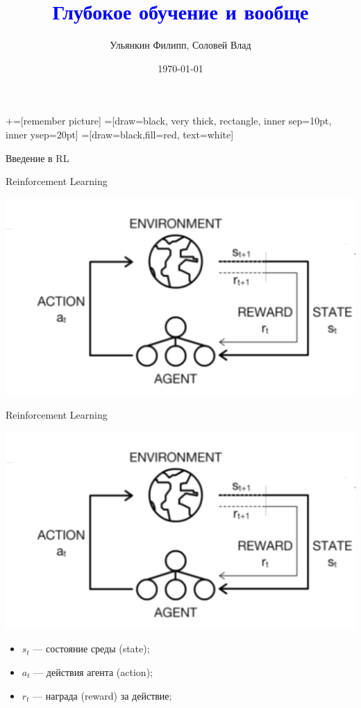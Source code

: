 \documentclass[notes,12pt, aspectratio=169]{beamer}
\title[]{\textcolor{blue}{Глубокое обучение и вообще}}
\author{Ульянкин Филипп, Соловей Влад}
\date{\today}
\begin{document}
\newcommand\marktopleft[1]{%
    \tikz[overlay,remember picture] 
        \node (marker-#1-a) at (-.3em,.3em) {};%
}
\newcommand\markbottomright[2]{%
    \tikz[overlay,remember picture] 
        \node (marker-#1-b) at (0em,0em) {};%
}
+=[remember picture] 
 =[draw=black, very thick, rectangle, inner sep=10pt, inner ysep=20pt]
 =[draw=black,fill=red, text=white]

\begin{frame}
\maketitle
\centering Введение в RL 
\end{frame}


\begin{frame}{Reinforcement Learning}
\begin{center}
	\includegraphics[width=.6\linewidth]{rl_1.png}
\end{center}
\end{frame}


\begin{frame}{Reinforcement Learning}
\begin{center}
	\includegraphics[width=.4\linewidth]{rl_1.png}
\end{center}
\begin{itemize}
	\item  $s_t$ — состояние среды (state);
	\item  $a_t$ — действия агента (action);
	\item  $r_t$ — награда (reward) за действие;
\end{itemize}
\end{frame}
\end{document}
